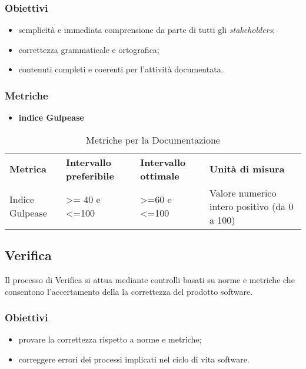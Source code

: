 \subsubsection{Obiettivi}
\begin{itemize}
	\item semplicità e immediata comprensione da parte di tutti gli \textit{stakeholders\glo};
	\item correttezza grammaticale e ortografica;
	\item contenuti completi e coerenti per l'attività documentata.
\end{itemize}
\subsubsection{Metriche}
\begin{itemize}
	\item \textbf{indice Gulpease}
\end{itemize}

\renewcommand{\arraystretch}{2.2}
\begin{longtable}{|C{2.5cm}|C{3.25cm}|C{3.25cm}|C{3cm}|}

	\caption{Metriche per la Documentazione}\\
	\hline

	\textbf{Metrica} & \textbf{Intervallo preferibile}  & \textbf{Intervallo ottimale} & \textbf{Unità di misura}
	\tabularnewline
	\endfirsthead

	Indice Gulpease & >= 40 e <=100  & >=60 e <=100 & Valore numerico intero positivo (da 0 a 100) \\

\end{longtable}




\subsection{Verifica}
Il processo di Verifica si attua mediante controlli basati su norme e metriche che consentono l'accertamento della la correttezza del prodotto software.
\subsubsection{Obiettivi}
\begin{itemize}
	\item provare la correttezza rispetto a norme e metriche;
	\item correggere errori dei processi implicati nel ciclo di vita software.
\end{itemize}
